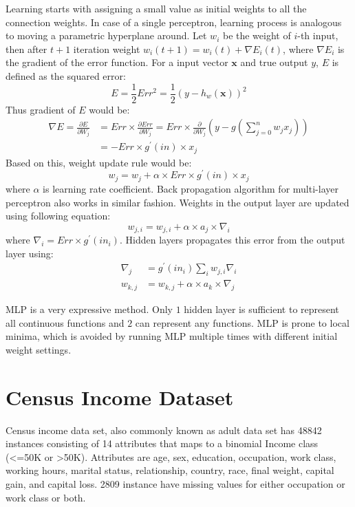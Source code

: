 Learning starts with assigning a small value as initial weights to all the connection weights. In case of a single perceptron, learning process is analogous to moving a parametric hyperplane around. Let $w_i$ be the weight of $i$-th input, then after $t+1$ iteration weight $w_i(t+1) = w_i(t) + \nabla E_i(t)$, where $\nabla E_i$ is the gradient of the error function. For a input vector $\mathbf{x}$ and true output $y$, $E$ is defined as the squared error:
\[
E = \frac{1}{2} Err^2 = \frac{1}{2} (y - h_w(\mathbf{x}))^2
\]
Thus gradient of $E$ would be:
\begin{align*}
    \nabla E = \frac{\partial E}{\partial W_j} & = Err \times \frac{\partial Err}{\partial W_j} = Err \times \frac{\partial}{\partial W_j} (y - g(\sum_{j=0}^n w_j x_j)) \\
    & = - Err \times g^{\prime} (in) \times x_j
\end{align*}
Based on this, weight update rule would be:
\[
w_j = w_j + \alpha \times Err \times g^{\prime} (in) \times x_j
\]
where $\alpha$ is learning rate coefficient. Back propagation algorithm for multi-layer perceptron also works in similar fashion. Weights in the output layer are updated using following equation:
\[
w_{j,i} = w_{j,i} + \alpha \times a_j \times \nabla_i
\]
where $\nabla_i = Err \times g^\prime(in_i)$. Hidden layers propagates this error from the output layer using:
\begin{align*}
    \nabla_j &= g^\prime (in_i) \sum_i w_{j,i} \nabla_i \\
    w_{k, j} &= w_{k, j} + \alpha \times a_k \times \nabla_j
\end{align*}

MLP is a very expressive method. Only $1$ hidden layer is sufficient to represent all continuous functions and $2$ can represent any functions. MLP is prone to local minima, which is avoided by running MLP multiple times with different initial weight settings.
\clearpage

\chapter{Census Income Dataset}
\label{appndx:ci}

Census income data set, also commonly known as adult data set has 48842 instances consisting of 14 attributes that maps to a binomial Income class (<=50K or >50K). Attributes are age, sex, education, occupation, work class, working hours, marital status, relationship, country, race, final weight, capital gain, and capital loss. 2809 instance have missing values for either occupation or work class or both.


